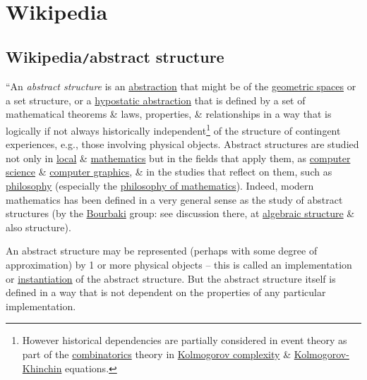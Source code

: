 \documentclass{article}
\begin{document}

\section{Wikipedia}

\subsection{Wikipedia{\tt/}abstract structure}
``An {\it abstract structure} is an \href{https://en.wikipedia.org/wiki/Abstraction}{abstraction} that might be of the \href{https://en.wikipedia.org/wiki/Euclidean_space}{geometric spaces} or a set structure, or a \href{https://en.wikipedia.org/wiki/Hypostatic_abstraction}{hypostatic abstraction} that is defined by a set of mathematical theorems \& laws, properties, \& relationships in a way that is logically if not always historically independent\footnote{However historical dependencies are partially considered in event theory as part of the \href{https://en.wikipedia.org/wiki/Combinatorics}{combinatorics} theory in \href{https://en.wikipedia.org/wiki/Kolmogorov_complexity}{Kolmogorov complexity} \& \href{https://en.wikipedia.org/wiki/Wiener-Khinchin_theorem}{Kolmogorov-Khinchin} equations.} of the structure of contingent experiences, e.g., those involving physical objects. Abstract structures are studied not only in \href{https://en.wikipedia.org/wiki/Logic}{local} \& \href{https://en.wikipedia.org/wiki/Mathematics}{mathematics} but in the fields that apply them, as \href{https://en.wikipedia.org/wiki/Computer_science}{computer science} \& \href{https://en.wikipedia.org/wiki/Computer_graphics}{computer graphics}, \& in the studies that reflect on them, such as \href{https://en.wikipedia.org/wiki/Philosophy}{philosophy} (especially the \href{https://en.wikipedia.org/wiki/Philosophy_of_mathematics}{philosophy of mathematics}). Indeed, modern mathematics has been defined in a very general sense as the study of abstract structures (by the \href{https://en.wikipedia.org/wiki/Nicolas_Bourbaki}{Bourbaki} group: see discussion there, at \href{https://en.wikipedia.org/wiki/Algebraic_structure}{algebraic structure} \& also structure).

An abstract structure may be represented (perhaps with some degree of approximation) by 1 or more physical objects -- this is called an implementation or \href{https://en.wikipedia.org/wiki/Instantiation_principle}{instantiation} of the abstract structure. But the abstract structure itself is defined in a way that is not dependent on the properties of any particular implementation.
\end{document}
